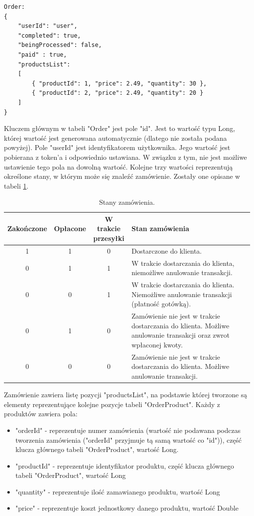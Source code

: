 \documentclass[11pt,a4paper,twoside]{article}
\begin{document}
\begin{lstlisting}
Order:
{
    "userId": "user",
    "completed": true,
    "beingProcessed": false,
    "paid" : true,
    "productsList": 
    [
    	{ "productId": 1, "price": 2.49, "quantity": 30 },
        { "productId": 2, "price": 2.49, "quantity": 20 }			
    ]
}
\end{lstlisting}
\vspace{-20pt}
Kluczem głównym w tabeli "Order" jest pole "id". Jest to wartość typu Long, której wartość jest generowana automatycznie (dlatego nie została podana powyżej). Pole "userId" jest identyfikatorem użytkownika. Jego wartość jest pobierana z token'a i odpowiednio ustawiana. W związku z tym, nie jest możliwe ustawienie tego pola na dowolną wartość. Kolejne trzy wartości reprezentują określone stany, w którym może się znaleźć zamówienie. Zostały one opisane w tabeli \ref{stanyZamowienia}. 

\begin{table}[htp]
\caption{Stany zamówienia.}
\label{stanyZamowienia}
\centering
\begin{tabularx}{\textwidth}{|c|c|c|X|}
\hline
 Zakończone & Opłacone & \makecell{W trakcie \\ przesyłki} & Stan zamówienia \\\hline
 1 & 1 & 0 & Dostarczone do klienta. \\\hline
 0 & 1 & 1 & W trakcie dostarczania do klienta, niemożliwe anulowanie transakcji. \\\hline
 0 & 0 & 1 & W trakcie dostarczania do klienta. Niemożliwe anulowanie transakcji (płatność gotówką). \\\hline
 0 & 1 & 0 & Zamówienie nie jest w trakcie dostarczania do klienta. Możliwe anulowanie transakcji oraz zwrot wpłaconej kwoty. \\\hline
 0 & 0 & 0 & Zamówienie nie jest w trakcie dostarczania do klienta. Możliwe anulowanie transakcji. \\\hline
\end{tabularx}
\end{table}

Zamówienie zawiera listę  pozycji  "productsList", na podstawie której tworzone są elementy reprezentujące kolejne pozycje tabeli "OrderProduct". Każdy z produktów zawiera pola:
\begin{itemize}
\setlength\itemsep{1.3em}
\item "orderId" - reprezentuje numer zamówienia (wartość nie podawana podczas tworzenia zamówienia ("orderId" przyjmuje tą samą wartość co "id")), część klucza głównego tabeli "OrderProduct", wartość Long.
\item "productId" - reprezentuje identyfikator produktu, część klucza głównego tabeli "OrderProduct", wartość Long
\item "quantity" - reprezentuje ilość zamawianego produktu, wartość Long 
\item "price" - reprezentuje koszt jednostkowy danego produktu, wartość Double
\end{itemize}
\end{document}

